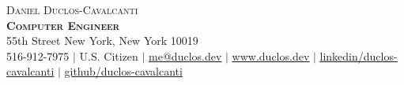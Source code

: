 \documentclass[letterpaper,11pt]{article}
\begin{document}

\begin{center}
    {\Huge \scshape Daniel Duclos-Cavalcanti} \\ \vspace{1pt}
    \textbf{\large{\scshape Computer Engineer}} \\ \vspace{1pt}
    55th Street New York, New York 10019 \\ \vspace{1pt}
    \small 516-912-7975 $|$ U.S. Citizen $|$
    \href{mailto:me@duclos.dev}{\underline{me@duclos.dev}} $|$ 
    \href{https://www.duclos.dev}{\underline{www.duclos.dev}} $|$
    \href{https://www.linkedin.com/in/duclos-cavalcanti/}{\underline{linkedin/duclos-cavalcanti}} $|$
    \href{https://github.com/duclos-cavalcanti}{\underline{github/duclos-cavalcanti}} 
\end{center}


\vspace{-16pt}
\end{document}
